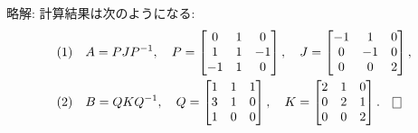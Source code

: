 \documentclass[12pt,twoside]{jarticle}
\newcommand\commentout[1]{#1}
\newcommand\commentout[1]{}
\begin{document}
\commentout{
\medskip\noindent
略解: 計算結果は次のようになる:
\begin{align*}
  &
  \text{(1)} \quad
  A = PJP^{-1},
  \quad
  P =
  \begin{bmatrix}
     0 &  1 &  0 \\
     1 &  1 & -1 \\
    -1 &  1 &  0 \\
  \end{bmatrix},
  \quad
  J = 
  \begin{bmatrix}
    -1 &  1 &  0 \\
     0 & -1 &  0 \\
     0 &  0 &  2 \\
  \end{bmatrix},
  \\ &
  \text{(2)} \quad
  B = QKQ^{-1},
  \quad
  Q =
  \begin{bmatrix}
    1 & 1 & 1 \\
    3 & 1 & 0 \\
    1 & 0 & 0 \\
  \end{bmatrix},
  \quad
  K = 
  \begin{bmatrix}
    2 & 1 & 0 \\
    0 & 2 & 1 \\
    0 & 0 & 2 \\
  \end{bmatrix}.
  \qed
\end{align*}
}
\end{document}

